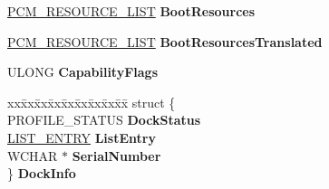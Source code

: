 \begin{DoxyCompactItemize}
\begin{tabbing}
\end{tabbing}\item 
\mbox{\label{struct___d_e_v_i_c_e___n_o_d_e_a86d47b0fb48ce5d70f142153d218ea10}} 
\hyperlink{struct___c_m___r_e_s_o_u_r_c_e___l_i_s_t}{P\+C\+M\+\_\+\+R\+E\+S\+O\+U\+R\+C\+E\+\_\+\+L\+I\+ST} {\bfseries Boot\+Resources}
\item 
\mbox{\label{struct___d_e_v_i_c_e___n_o_d_e_a7f7b9948592c57c20b3b45491ee58f15}} 
\hyperlink{struct___c_m___r_e_s_o_u_r_c_e___l_i_s_t}{P\+C\+M\+\_\+\+R\+E\+S\+O\+U\+R\+C\+E\+\_\+\+L\+I\+ST} {\bfseries Boot\+Resources\+Translated}
\item 
\mbox{\label{struct___d_e_v_i_c_e___n_o_d_e_a06c538986d3302ccb726ea557a492649}} 
U\+L\+O\+NG {\bfseries Capability\+Flags}
\item 
\mbox{\label{struct___d_e_v_i_c_e___n_o_d_e_a93bbf0ed551d8458d4d7bb6347aaac1f}} 
\begin{tabbing}
xx\=xx\=xx\=xx\=xx\=xx\=xx\=xx\=xx\=\kill
struct \{\\
\>PROFILE\_STATUS {\bfseries DockStatus}\\
\>\hyperlink{struct___l_i_s_t___e_n_t_r_y}{LIST\_ENTRY} {\bfseries ListEntry}\\
\>WCHAR $\ast$ {\bfseries SerialNumber}\\
\} {\bfseries DockInfo}\\


\end{tabbing}
\end{DoxyCompactItemize}
